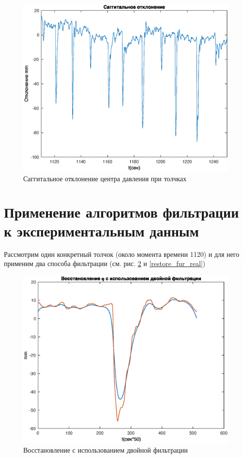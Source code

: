 \documentclass[a4paper,12pt, openany]{book}
\theoremstyle{plain} %
\theoremstyle{definition} %
\theoremstyle{remark} %
\numberwithin{equation}{chapter}
\begin{document}
{\begin{figure}[h!]
    \centering
    \includegraphics[width=0.9\linewidth]{y_real.eps}
    \caption{Саггитальное отклонение центра давления при толчках}
    \label{y_real}
\end{figure}



\section{Применение алгоритмов фильтрации к экспериментальным данным}
Рассмотрим один конкретный толчок (около момента времени 1120) и для него применим два способа
фильтрации (см. рис. \ref{restore_double_real} и \ref{restore_fur_real})

\begin{figure}[h!]
    \centering
    \includegraphics[width=0.65\linewidth]{restore_eta_double_real.eps}
    \caption{Восстановление с использованием двойной фильтрации}
    \label{restore_double_real}
\end{figure}

}
\end{document}
